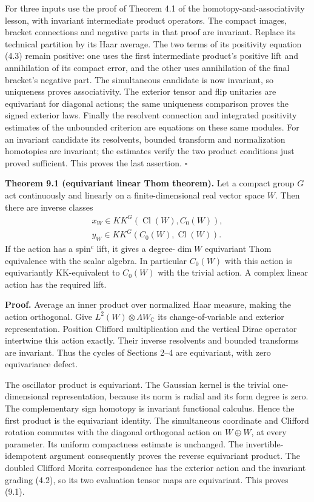 \documentclass[
  11pt,
]{article}
\begin{document}
For three inputs use the proof of Theorem 4.1 of the
homotopy-and-associativity lesson, with invariant intermediate product
operators. The compact images, bracket connections and negative parts in
that proof are invariant. Replace its technical partition by its Haar
average. The two terms of its positivity equation (4.3) remain positive:
one uses the first intermediate product's positive lift and annihilation
of its compact error, and the other uses annihilation of the final
bracket's negative part. The simultaneous candidate is now invariant, so
uniqueness proves associativity. The exterior tensor and flip unitaries
are equivariant for diagonal actions; the same uniqueness comparison
proves the signed exterior laws. Finally the resolvent connection and
integrated positivity estimates of the unbounded criterion are equations
on these same modules. For an invariant candidate its resolvents,
bounded transform and normalization homotopies are invariant; the
estimates verify the two product conditions just proved sufficient. This
proves the last assertion. \(\square\)

\textbf{Theorem 9.1 (equivariant linear Thom theorem).} Let a compact
group \(G\) act continuously and linearly on a finite-dimensional real
vector space \(W\). Then there are inverse classes \[
\begin{gathered}
x_W\in KK^G(\operatorname{Cl}(W),C_0(W)),\\
y_W\in KK^G(C_0(W),\operatorname{Cl}(W)).
\end{gathered}
\tag{9.1}
\] If the action has a spin\(^{c}\) lift, it gives a degree-\(\dim W\)
equivariant Thom equivalence with the scalar algebra. In particular
\(C_0(W)\) with this action is equivariantly KK-equivalent to \(C_0(W)\)
with the trivial action. A complex linear action has the required lift.

\textbf{Proof.} Average an inner product over normalized Haar measure,
making the action orthogonal. Give
\(L^2(W)\otimes\Lambda W_{\mathbb C}\) its change-of-variable and
exterior representation. Position Clifford multiplication and the
vertical Dirac operator intertwine this action exactly. Their inverse
resolvents and bounded transforms are invariant. Thus the cycles of
Sections 2--4 are equivariant, with zero equivariance defect.

The oscillator product is equivariant. The Gaussian kernel is the
trivial one-dimensional representation, because its norm is radial and
its form degree is zero. The complementary sign homotopy is invariant
functional calculus. Hence the first product is the equivariant
identity. The simultaneous coordinate and Clifford rotation commutes
with the diagonal orthogonal action on \(W\oplus W\), at every
parameter. Its uniform compactness estimate is unchanged. The
invertible-idempotent argument consequently proves the reverse
equivariant product. The doubled Clifford Morita correspondence has the
exterior action and the invariant grading (4.2), so its two evaluation
tensor maps are equivariant. This proves (9.1).
\end{document}
